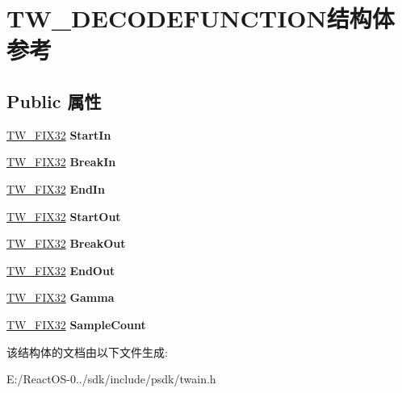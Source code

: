 \hypertarget{struct_t_w___d_e_c_o_d_e_f_u_n_c_t_i_o_n}{}\section{T\+W\+\_\+\+D\+E\+C\+O\+D\+E\+F\+U\+N\+C\+T\+I\+O\+N结构体 参考}
\label{struct_t_w___d_e_c_o_d_e_f_u_n_c_t_i_o_n}
\subsection*{Public 属性}
\begin{DoxyCompactItemize}
\item 
\mbox{\label{struct_t_w___d_e_c_o_d_e_f_u_n_c_t_i_o_n_a9bb6581ef56fe3b05c76543bbbc0eb48}} 
\hyperlink{struct_t_w___f_i_x32}{T\+W\+\_\+\+F\+I\+X32} {\bfseries Start\+In}
\item 
\mbox{\label{struct_t_w___d_e_c_o_d_e_f_u_n_c_t_i_o_n_a1261c5e038dab4c357f05d04f43b315f}} 
\hyperlink{struct_t_w___f_i_x32}{T\+W\+\_\+\+F\+I\+X32} {\bfseries Break\+In}
\item 
\mbox{\label{struct_t_w___d_e_c_o_d_e_f_u_n_c_t_i_o_n_a7c9a08b2d5906ed6960c1d394bb3e17c}} 
\hyperlink{struct_t_w___f_i_x32}{T\+W\+\_\+\+F\+I\+X32} {\bfseries End\+In}
\item 
\mbox{\label{struct_t_w___d_e_c_o_d_e_f_u_n_c_t_i_o_n_a19a4e0d0e10a8afd761b80cff1165308}} 
\hyperlink{struct_t_w___f_i_x32}{T\+W\+\_\+\+F\+I\+X32} {\bfseries Start\+Out}
\item 
\mbox{\label{struct_t_w___d_e_c_o_d_e_f_u_n_c_t_i_o_n_af7a99e9ed48519c26225e75c76887daf}} 
\hyperlink{struct_t_w___f_i_x32}{T\+W\+\_\+\+F\+I\+X32} {\bfseries Break\+Out}
\item 
\mbox{\label{struct_t_w___d_e_c_o_d_e_f_u_n_c_t_i_o_n_a34063db02a0f1c715304e2a0915cc4d1}} 
\hyperlink{struct_t_w___f_i_x32}{T\+W\+\_\+\+F\+I\+X32} {\bfseries End\+Out}
\item 
\mbox{\label{struct_t_w___d_e_c_o_d_e_f_u_n_c_t_i_o_n_adbd68faeb595562a8fd46215f3911d41}} 
\hyperlink{struct_t_w___f_i_x32}{T\+W\+\_\+\+F\+I\+X32} {\bfseries Gamma}
\item 
\mbox{\label{struct_t_w___d_e_c_o_d_e_f_u_n_c_t_i_o_n_a0da76daf86ac66b4a87ce050747d4f2e}} 
\hyperlink{struct_t_w___f_i_x32}{T\+W\+\_\+\+F\+I\+X32} {\bfseries Sample\+Count}
\end{DoxyCompactItemize}


该结构体的文档由以下文件生成\+:\begin{DoxyCompactItemize}
\item 
E\+:/\+React\+O\+S-\/0../sdk/include/psdk/twain.\+h\end{DoxyCompactItemize}
